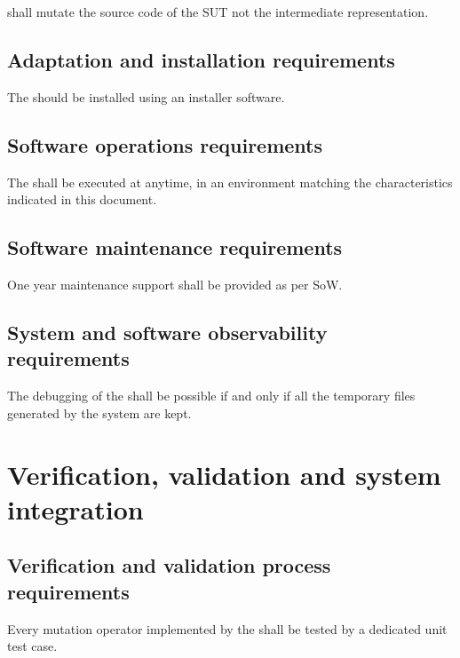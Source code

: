 \RQ{} \FAQAS shall mutate the source code of the SUT not the intermediate representation.


\section{Adaptation and installation requirements}


% 
\RQ{} The \FAQAS should be installed using an installer software.


\section{Software operations requirements}

\RQ{} The \FAQAS shall be executed at anytime, 
in an environment matching the characteristics indicated in this document.

\section{Software maintenance requirements}

\RQ{} One year maintenance support shall be provided as per SoW.

\section{System and software observability requirements}

\RQ{} The debugging of the \FAQAS shall be possible if and only if 
all the temporary files generated by the system are kept.

\chapter{Verification, validation and system integration}
 \section{Verification and validation process requirements}
 
\RQ{} Every mutation operator implemented by the \FAQAS shall be tested by a dedicated unit test case.
 
